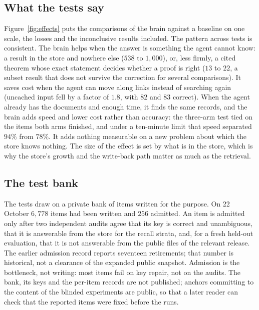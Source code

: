 

\subsection{What the tests say}
Figure~\ref{fig:effects} puts the comparisons of the brain against a baseline on one scale, the losses and the inconclusive results included. The pattern across tests is consistent. The brain helps when the answer is something the agent cannot know: a result in the store and nowhere else ($538$ to $1{,}000$), or, less firmly, a cited theorem whose exact statement decides whether a proof is right ($13$ to $22$, a subset result that does not survive the correction for several comparisons). It saves cost when the agent can move along links instead of searching again (uncached input fell by a factor of $1.8$, with $82$ and $83$ correct). When the agent already has the documents and enough time, it finds the same records, and the brain adds speed and lower cost rather than accuracy: the three-arm test tied on the items both arms finished, and under a ten-minute limit that speed separated $94\%$ from $78\%$. It adds nothing measurable on a new problem about which the store knows nothing. The size of the effect is set by what is in the store, which is why the store's growth and the write-back path matter as much as the retrieval.

\subsection{The test bank}
The tests draw on a private bank of items written for the purpose. On 22 October $6{,}778$ items had been written and $256$ admitted. An item is admitted only after two independent audits agree that its key is correct and unambiguous, that it is answerable from the store for the recall strata, and, for a fresh held-out evaluation, that it is not answerable from the public files of the relevant release. The earlier admission record reports seventeen retirements; that number is historical, not a clearance of the expanded public snapshot. Admission is the bottleneck, not writing: most items fail on key repair, not on the audits. The bank, its keys and the per-item records are not published; anchors committing to the content of the blinded experiments are public, so that a later reader can check that the reported items were fixed before the runs.
